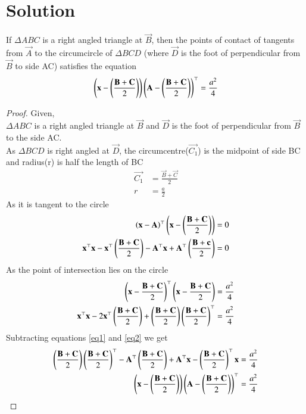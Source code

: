 \documentclass[journal,12pt,twocolumn]{IEEEtran}
\begin{document}
\section{Solution}
\begin{lemma}
If $\Delta ABC$ is a right angled triangle at $\vec{B}$, then the points of contact of tangents from $\vec{A}$ to the circumcircle of $\Delta BCD$ (where $\vec{D}$ is the foot of perpendicular from $\vec{B}$ to side AC) satisfies the equation
\begin{align}
\label{eq}
    \left(\mathbf{x}-\left(\frac{\mathbf{B}+\mathbf{C}}{2}\right)\right)\left(\mathbf{A}-\left(\frac{\mathbf{B}+\mathbf{C}}{2}\right)\right)^\top=\frac{a^{2}}{4}
\end{align}
\end{lemma}
\begin{proof}
Given,\\
$\Delta ABC$ is a right angled triangle at $\vec{B}$ and $\vec{D}$ is the foot of perpendicular from $\vec{B}$ to the side AC.\\
As $\Delta BCD$ is right angled at $\vec{D}$, the circumcentre($\vec{C_{1}}$) is the midpoint of side BC and radius(r) is half the length of BC
\begin{align}
    \vec{C_{1}}&=\frac{\vec{B}+\vec{C}}{2}\\
    r&=\frac{a}{2}
\end{align}
As it is tangent to the circle 
\begin{align}
    \left(\mathbf{x}-\mathbf{A}\right)^\top\left(\mathbf{x}-\left(\frac{\mathbf{B}+\mathbf{C}}{2}\right)\right)&=0\\
    \mathbf{x}^\top\mathbf{x}-\mathbf{x}^\top\left(\frac{\mathbf{B}+\mathbf{C}}{2}\right)-\mathbf{A}^\top\mathbf{x}+\mathbf{A}^\top\left(\frac{\mathbf{B}+\mathbf{c}}{2}\right)&=0
    \label{eq1}
\end{align}
As the point of intersection lies on the circle 
\begin{align}
    \left(\mathbf{x}-\frac{\mathbf{B}+\mathbf{C}}{2}\right)^\top\left(\mathbf{x}-\frac{\mathbf{B}+\mathbf{C}}{2}\right)&=\frac{a^{2}}{4}\\
    \mathbf{x}^\top\mathbf{x}-2\mathbf{x}^\top\left(\frac{\mathbf{B}+\mathbf{C}}{2}\right)+\left(\frac{\mathbf{B}+\mathbf{C}}{2}\right)\left(\frac{\mathbf{B}+\mathbf{C}}{2}\right)^\top&=\frac{a^2}{4}
    \label{eq2}
\end{align}
Subtracting equations \ref{eq1} and \ref{eq2} we get
\begin{align}
    \left(\frac{\mathbf{B}+\mathbf{C}}{2}\right)\left(\frac{\mathbf{B}+\mathbf{C}}{2}\right)^\top - \mathbf{A}^\top\left(\frac{\mathbf{B}+\mathbf{C}}{2}\right)+\mathbf{A}^\top\mathbf{x}-\left(\frac{\mathbf{B}+\mathbf{C}}{2}\right)^\top\mathbf{x}=\frac{a^2}{4}\\
    \left(\mathbf{x}-\left(\frac{\mathbf{B}+\mathbf{C}}{2}\right)\right)\left(\mathbf{A}-\left(\frac{\mathbf{B}+\mathbf{C}}{2}\right)\right)^\top =\frac{a^2}{4}
\end{align}
\end{proof}
\end{document}
